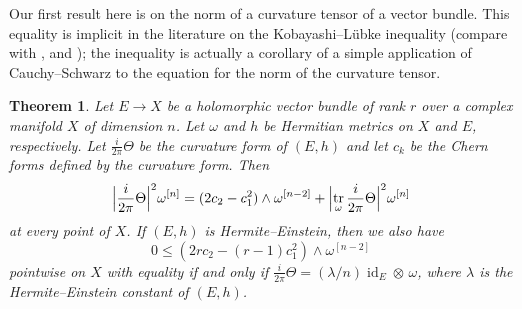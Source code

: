 \documentclass[11pt,a4paper]{amsart}
\def\^#1{^{[#1]}}
\DeclareMathOperator{\tr}{tr}
\DeclareMathOperator{\id}{id}
\def\skrun{\frac{i}{2\pi} \Theta}
\newtheorem{theo}{Theorem}[section]
\theoremstyle{definition}
\numberwithin{equation}{section}
\begin{document}
Our first result here is on the norm of a curvature tensor of a vector
bundle. This equality is implicit in the literature on the
Kobayashi--L\"{u}bke inequality (compare with \cite{Chen-Ogiue},
\cite{Lubke} and \cite{Siu}); the inequality is actually a corollary of a
simple application of Cauchy--Schwarz to the equation for the norm of the
curvature tensor.

\begin{theo}
    Let $E \to X$ be a holomorphic vector bundle of rank $r$ over a complex
manifold $X$ of dimension $n$. Let $\omega$ and $h$ be Hermitian metrics on
$X$ and $E$, respectively. Let $\skrun$ be the curvature form of $(E,h)$
and let $c_k$ be the Chern forms defined by the curvature form. Then
$$
\Bigl\lvert \skrun \Bigr\rvert^2 \omega\^n
= (2 c_2 - c_1^2) \wedge \omega\^{n-2}
+ \Bigl\lvert \tr_\omega \skrun \Bigr\rvert^2 \omega\^n
$$
at every point of $X$. If $(E,h)$ is Hermite--Einstein, then we also have
$$
0 \leq 
(2r c_2 - (r-1) c_1^2) \wedge \omega\^{n-2}
$$
pointwise on $X$ with equality if and only if $\skrun = (\lambda/n) \id_E
\otimes\, \omega$, where $\lambda$ is the Hermite--Einstein constant of
$(E,h)$.
\end{theo}
\end{document}
